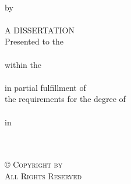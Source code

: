 \vspace*{\fill}
\begin{center}
\doublespaced
\MakeUppercase{\projecttitle}\\
by\\
\projectauthor \\
\singlespaced
\vspace{20pt}
A DISSERTATION\\
\vspace{30pt}
Presented to the\\
\department\\
within the \institution\\
\school\\
in partial fulfillment of\\
the requirements for the degree of\\
\degree\\
in\\
\track\\
\vspace{30pt}
\completionmonth \completionyear\\
\end{center}
\vspace*{\fill}
\clearpage

\vspace*{\fill}
\begin{center}
\doublespaced
\scshape \copyright \hspace{3pt} Copyright \completionyear by \projectauthor\\
All Rights Reserved
\end{center}
\vspace*{\fill}
\clearpage

